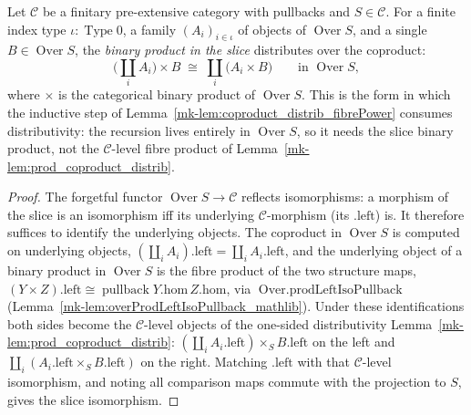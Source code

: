 \begin{lemma}
  \label{mk-lem:overProd_coproduct_distrib}

  Let \(\mathcal{C}\) be a finitary pre-extensive category with pullbacks and \(S \in \mathcal{C}\).
  For a finite index type \(\iota : \operatorname{Type} 0\), a family \((A_i)_{i \in \iota}\) of
  objects of \(\operatorname{Over} S\), and a single \(B \in \operatorname{Over} S\), the
  \emph{binary product in the slice} distributes over the coproduct:
  \[
    \bigl(\textstyle\coprod_{i} A_i\bigr) \times B
      \;\cong\;
    \coprod_{i} \bigl(A_i \times B\bigr)
      \qquad\text{in } \operatorname{Over} S,
  \]
  where \(\times\) is the categorical binary product of \(\operatorname{Over} S\). This is the form in
  which the inductive step of Lemma~\ref{mk-lem:coproduct_distrib_fibrePower} consumes distributivity:
  the recursion lives entirely in \(\operatorname{Over} S\), so it needs the slice binary product, not
  the \(\mathcal{C}\)-level fibre product of Lemma~\ref{mk-lem:prod_coproduct_distrib}.
\end{lemma}
\begin{proof}
  The forgetful functor \(\operatorname{Over} S \to \mathcal{C}\) reflects isomorphisms: a morphism of
  the slice is an isomorphism iff its underlying \(\mathcal{C}\)-morphism (its \(.\mathrm{left}\)) is.
  It therefore suffices to identify the underlying objects. The coproduct in \(\operatorname{Over} S\)
  is computed on underlying objects, \((\coprod_i A_i).\mathrm{left} = \coprod_i A_i.\mathrm{left}\),
  and the underlying object of a binary product in \(\operatorname{Over} S\) is the fibre product of
  the two structure maps, \((Y \times Z).\mathrm{left} \cong \operatorname{pullback} Y.\mathrm{hom}\,
  Z.\mathrm{hom}\), via \(\operatorname{Over.prodLeftIsoPullback}\)
  (Lemma~\ref{mk-lem:overProdLeftIsoPullback_mathlib}). Under these identifications both sides become
  the \(\mathcal{C}\)-level objects of the one-sided distributivity
  Lemma~\ref{mk-lem:prod_coproduct_distrib}: \((\coprod_i A_i.\mathrm{left}) \times_S B.\mathrm{left}\)
  on the left and \(\coprod_i (A_i.\mathrm{left} \times_S B.\mathrm{left})\) on the right. Matching
  \(.\mathrm{left}\) with that \(\mathcal{C}\)-level isomorphism, and noting all comparison maps commute
  with the projection to \(S\), gives the slice isomorphism.
\end{proof}

